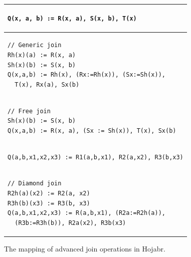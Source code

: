 \begin{figure}[t!]
\begin{tabular}{|l|}
\hline 
\begin{lstlisting}
Q(x, a, b) := R(x, a), S(x, b), T(x)
\end{lstlisting} \\ \hline \hline
\begin{lstlisting}
// Generic join
Rh(x)(a) := R(x, a)
Sh(x)(b) := S(x, b)
Q(x,a,b) := Rh(x), (Rx:=Rh(x)), (Sx:=Sh(x)), 
  T(x), Rx(a), Sx(b)
\end{lstlisting} \\ \hline
\begin{lstlisting}
// Free join
Sh(x)(b) := S(x, b)
Q(x,a,b) := R(x, a), (Sx := Sh(x)), T(x), Sx(b)
\end{lstlisting}
\\ \hline 
\hline \hline
\begin{lstlisting}
Q(a,b,x1,x2,x3) := R1(a,b,x1), R2(a,x2), R3(b,x3)
\end{lstlisting} \\ \hline \hline
\begin{lstlisting}
// Diamond join
R2h(a)(x2) := R2(a, x2)
R3h(b)(x3) := R3(b, x3)
Q(a,b,x1,x2,x3) := R(a,b,x1), (R2a:=R2h(a)), 
  (R3b:=R3h(b)), R2a(x2), R3b(x3)
\end{lstlisting} \\ \hline
\end{tabular}
\caption{The mapping of advanced join operations in Hojabr.}
\label{fig:advjoin}
\end{figure}